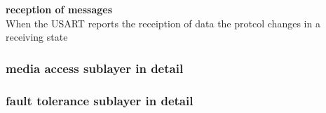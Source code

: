 \textbf{reception of messages}\\
When the USART reports the receiption of data the protcol changes in a receiving state 


\subsubsection{media access sublayer in detail}
\label{sec:bus:design:layer2:mac}


\subsubsection{fault tolerance sublayer in detail}
\label{sec:bus:design:layer2:ft}


 